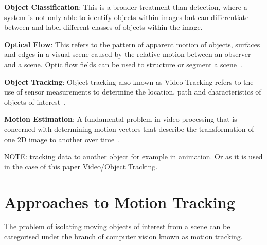 \textbf{Object Classification}: This is a broader treatment than detection, where a
system is not only able to identify objects within images but can differentiate
between and label different classes of objects within the image. 

\textbf{Optical Flow}: This refers to the pattern of apparent motion of objects, surfaces and
edges in a visual scene caused by the relative motion between an observer and a
scene. Optic flow fields can be used to structure or segment a scene~\cite{Forsyth2012}.

\textbf{Object Tracking}: Object tracking also known as Video Tracking refers to the use
of sensor measurements to determine the location, path and characteristics of
objects of interest~\cite{Challa2011}.
 
\textbf{Motion Estimation}: A fundamental problem in video processing that is concerned
with determining motion vectors that describe the transformation of one 2D
image to another over time~\cite{Tekalp2014}.

NOTE:\@
tracking data to another object for example in animation. Or as it is used in the
case of this paper Video/Object Tracking.

\section{Approaches to Motion Tracking}\label{literature_review_general_approach}
The problem of isolating moving objects of interest from a scene can
be categorised under the branch of computer vision known as motion
tracking.

